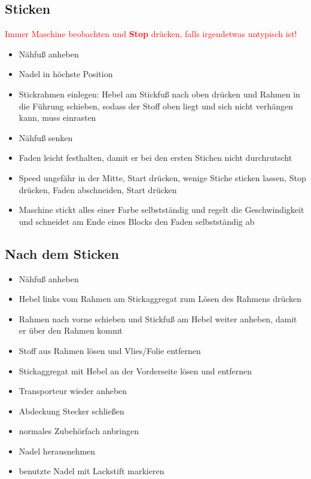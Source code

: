 \documentclass{\basedir/fablab-document}
\begin{document}
\subsection{Sticken}
\textcolor{red}{Immer Maschine beobachten und \textbf{Stop} drücken, falls irgendetwas untypisch ist!}

\vspace{1em}

\begin{itemize}
 \item Nähfuß anheben
 \item Nadel in höchste Position
 \item Stickrahmen einlegen: Hebel am Stickfuß nach oben drücken und Rahmen in die Führung schieben, sodass der Stoff oben liegt und sich nicht verhängen kann, muss einrasten
 \item Nähfuß senken
 \item Faden leicht festhalten, damit er bei den ersten Stichen nicht durchrutscht
 \item Speed ungefähr in der Mitte, Start drücken, wenige Stiche sticken lassen, Stop drücken, Faden abschneiden, Start drücken
 \item Maschine stickt alles einer Farbe selbstständig und regelt die Geschwindigkeit und schneidet am Ende eines Blocks den Faden selbstständig ab
\end{itemize}


\subsection{Nach dem Sticken}
\begin{itemize}
 \item Nähfuß anheben
 \item Hebel links vom Rahmen am Stickaggregat zum Lösen des Rahmens drücken
 \item Rahmen nach vorne schieben und Stickfuß am Hebel weiter anheben, damit er über den Rahmen kommt
 \item Stoff aus Rahmen lösen und Vlies/Folie entfernen
 \item Stickaggregat mit Hebel an der Vorderseite lösen und entfernen
 \item Transporteur wieder anheben
 \item Abdeckung Stecker schließen
 \item normales Zubehörfach anbringen
 \item Nadel herausnehmen
 \item benutzte Nadel mit Lackstift markieren
\end{itemize}
\end{document}
